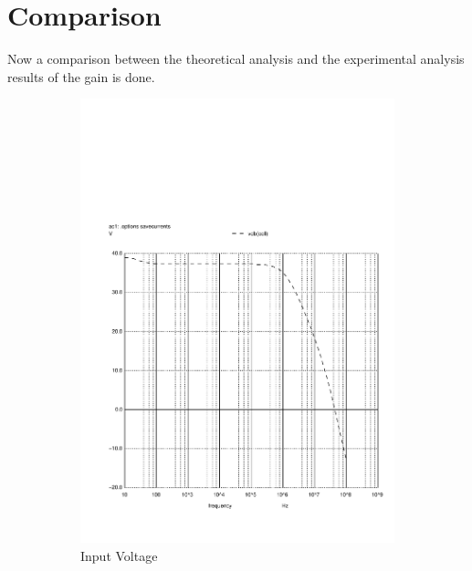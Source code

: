 \section{Comparison}
\label{section:comparison}

\par Now a comparison between the theoretical analysis and the experimental analysis results of the gain is done.
 
\begin{figure}[ht]
\centering
\begin{subfigure}{.5\textwidth}
  \centering
  \includegraphics[width=.75\linewidth]{vo1f.pdf}
  \caption{Input Voltage}
  \label{fig:sim4}
\end{subfigure}%
\begin{subfigure}{.5\textwidth}
  \centering

\end{subfigure}
\end{figure}
